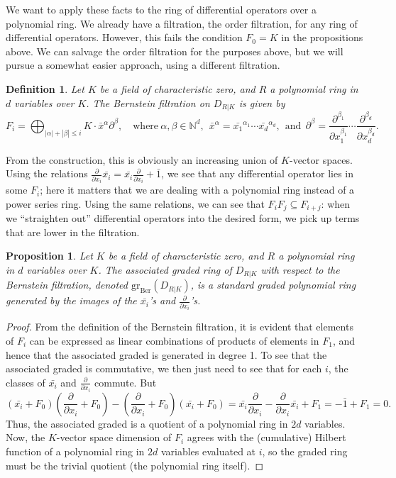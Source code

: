 \documentclass[11pt]{book}
\newtheorem{proposition}[theorem]{Proposition}
\newtheorem{definition}[theorem]{Definition}
\numberwithin{equation}{section}
\numberwithin{theorem}{chapter}
\theoremstyle{definition}
\newtheorem*{basic properties}{Basic Properties}
\newtheorem*{Important Remark}{Important Remark}
\theoremstyle{remark}
\newcommand{\NN}{\mathbb{N}}
\begin{document}
We want to apply these facts to the ring of differential operators over a polynomial ring. We already have a filtration, the order filtration, for any ring of differential operators. However, this fails the condition $F_0=K$ in the propositions above. We can salvage the order filtration for the purposes above, but we will pursue a somewhat easier approach, using a different filtration.

\begin{definition} Let $K$ be a field of characteristic zero, and $R$ a polynomial ring in $d$ variables over $K$. The \emph{Bernstein filtration} on $D_{R|K}$ is given by
	\[ F_i = \bigoplus_{|\alpha| + |\beta|\leq i} K \cdot \bar{x}^{\alpha} \partial^{\beta}, \quad\text{where} \
	\alpha,\beta \in \NN^d, \ \ \bar{x}^\alpha=\bar{x_1}^{\alpha_1}\cdots \bar{x_d}^{\alpha_d}, \ \ \text{and} \ \ \partial^{\beta}=\frac{\partial^{\beta_1}}{\partial x_1^{\beta_1}}\cdots \frac{\partial^{\beta_d}}{\partial x_d^{\beta_d}}.  \]
	\end{definition}

From the construction, this is obviously an increasing union of $K$-vector spaces. Using the relations $\frac{\partial}{\partial x_i}\bar{x_i}=\bar{x_i} \frac{\partial}{\partial x_i} + \bar{1}$, we see that any differential operator lies in some $F_i$; here it matters that we are dealing with a polynomial ring instead of a power series ring. Using the same relations, we can see that $F_i F_j \subseteq F_{i+j}$: when we ``straighten out'' differential operators into the desired form, we pick up terms that are lower in the filtration.

\begin{proposition} Let $K$ be a field of characteristic zero, and $R$ a polynomial ring in $d$ variables over $K$. The associated graded ring of $D_{R|K}$ with respect to the Bernstein filtration, denoted $\mathrm{gr}_{\mathrm{Ber}}(D_{R|K})$, is a standard graded polynomial ring generated by the images of the $\bar{x_i}$'s and $\frac{\partial}{\partial x_i}$'s.
	\end{proposition}
\begin{proof}
From the definition of the Bernstein filtration, it is evident that elements of $F_i$ can be expressed as linear combinations of products of elements in $F_1$, and hence that the associated graded is generated in degree 1. To see that the associated graded is commutative, we then just need to see that for each $i$, the classes of $\bar{x_i}$ and $\frac{\partial}{\partial x_i}$ commute. But 
	\[ (\bar{x_i} + F_0)\left(\frac{\partial}{\partial x_i} + F_0\right) - \left(\frac{\partial}{\partial x_i} + F_0\right)(\bar{x_i} + F_0) = \bar{x_i} \frac{\partial}{\partial x_i} - \frac{\partial}{\partial x_i} \bar{x_i}  + F_1 = -\bar{1} + F_1 = 0.\]
	Thus, the associated graded is a quotient of a polynomial ring in $2d$ variables. Now, the $K$-vector space dimension of $F_i$ agrees with the (cumulative) Hilbert function of a polynomial ring in $2d$ variables evaluated at $i$, so the graded ring must be the trivial quotient (the polynomial ring itself).
\end{proof}
\end{document}
